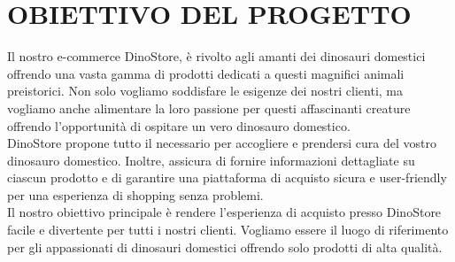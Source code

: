 \chapter{OBIETTIVO DEL PROGETTO}

Il nostro e-commerce DinoStore, è rivolto agli amanti dei dinosauri domestici offrendo una vasta gamma di prodotti dedicati a questi magnifici animali preistorici. Non solo vogliamo soddisfare le esigenze dei nostri clienti, ma vogliamo anche alimentare la loro passione per questi affascinanti creature offrendo l'opportunità di ospitare un vero dinosauro domestico.
\\
DinoStore propone tutto il necessario per accogliere e prendersi cura del vostro dinosauro domestico. Inoltre, assicura di fornire informazioni dettagliate su ciascun prodotto e di garantire una piattaforma di acquisto sicura e user-friendly per una esperienza di shopping senza problemi.
\\
Il nostro obiettivo principale è rendere l'esperienza di acquisto presso DinoStore facile e divertente per tutti i nostri clienti. Vogliamo essere il luogo di riferimento per gli appassionati di dinosauri domestici offrendo solo prodotti di alta qualità.